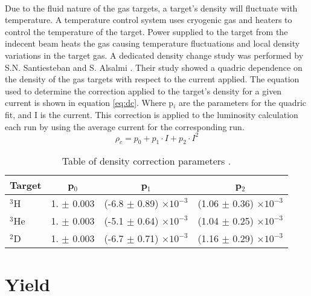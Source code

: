 \paragraph{}  Due to the fluid nature of the gas targets, a target's density will fluctuate with temperature. A temperature control system uses cryogenic gas and heaters to control the temperature of the target. Power supplied to the target from the indecent beam heats the gas causing temperature fluctuations and local density variations in the target gas. A dedicated density change study was performed by S.N. Santiesteban and S. Alsalmi \cite{denscor}. Their study showed a quadric dependence on the density of the gas targets with respect to the current applied. The equation used to determine the correction applied to the target's density for a given current is shown in equation \ref{eq:dc}. Where p$_i$ are the parameters for the quadric fit, and I is the current. This correction is applied to the luminosity calculation each run by using the average current for the corresponding run. 
\begin{equation}
\rho_c = p_0 + p_1 \cdot I + p_2 \cdot I^2 \label{eq:dc}
\end{equation}
\begin{table}[]
	\caption{Table of density correction parameters \cite{denscor}.}
	\centering
	\begin{tabular}{lccc}
		Target & p$_0$ & p$_1$ & p$_2$  \\
		\hline
		$^3$H & 1. $\pm$ 0.003 & (-6.8 $\pm$ 0.89) $\times 10^{-3}$ & (1.06 $\pm$ 0.36) $\times 10^{-3}$\\
		$^3$He & 1. $\pm$ 0.003 & (-5.1 $\pm$ 0.64) $\times 10^{-3}$ & (1.04 $\pm$ 0.25) $\times 10^{-3}$\\
		$^2$D & 1. $\pm$ 0.003 & (-6.7 $\pm$ 0.71) $\times 10^{-3}$ & (1.16 $\pm$ 0.29) $\times 10^{-3}$\\
		\hline
	\end{tabular}
\end{table}

\section{Yield}\label{sec:Yield}
